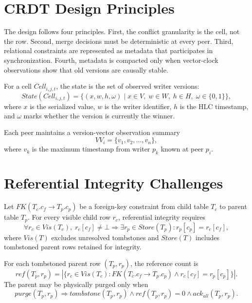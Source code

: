 \documentclass[pdflatex,sn-mathphys-num]{sn-jnl}
\begin{document}
\section{CRDT Design Principles}

The design follows four principles. First, the conflict granularity is the cell, not the row. Second, merge decisions must be deterministic at every peer. Third, relational constraints are represented as metadata that participates in synchronization. Fourth, metadata is compacted only when vector-clock observations show that old versions are causally stable.

For a cell $Cell_{i,j,t}$, the state is the set of observed writer versions:
\begin{equation}
State(Cell_{i,j,t})=\{(x,w,h,\omega)\mid x \in V,\; w\in W,\; h\in H,\; \omega\in\{0,1\}\},
\label{eq:cell-state}
\end{equation}
where $x$ is the serialized value, $w$ is the writer identifier, $h$ is the HLC timestamp, and $\omega$ marks whether the version is currently the winner.

Each peer maintains a version-vector observation summary
\begin{equation}
VV_i=\{v_1,v_2,\ldots,v_n\},
\label{eq:version-vector}
\end{equation}
where $v_k$ is the maximum timestamp from writer $p_k$ known at peer $p_i$.

\section{Referential Integrity Challenges}

Let $FK(T_c.c_f \rightarrow T_p.c_p)$ be a foreign-key constraint from child table $T_c$ to parent table $T_p$. For every visible child row $r_c$, referential integrity requires
\begin{equation}
\forall r_c\in Vis(T_c),\; r_c[c_f]\neq \bot \Rightarrow \exists r_p\in Store(T_p): r_p[c_p]=r_c[c_f],
\label{eq:fk-constraint}
\end{equation}
where $Vis(T)$ excludes unresolved tombstones and $Store(T)$ includes tombstoned parent rows retained for integrity.

For each tombstoned parent row $(T_p,r_p)$, the reference count is
\begin{equation}
ref(T_p,r_p)=|\{r_c\in Vis(T_c): FK(T_c.c_f\rightarrow T_p.c_p)\land r_c[c_f]=r_p[c_p]\}|.
\label{eq:ref-count}
\end{equation}
The parent may be physically purged only when
\begin{equation}
purge(T_p,r_p)\Rightarrow tombstone(T_p,r_p)\land ref(T_p,r_p)=0\land ack_{all}(T_p,r_p).
\label{eq:purge-condition}
\end{equation}
\end{document}
